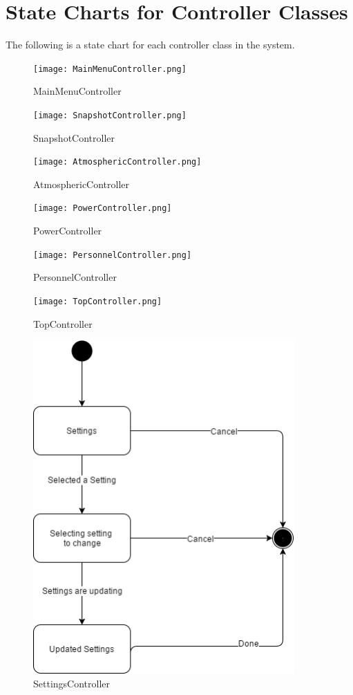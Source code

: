 \documentclass[]{article}
\begin{document}
\section{State Charts for Controller Classes}
\label{sec:state_charts_for_controller_classes}

The following is a state chart for each controller class in the system.

\begin{figure}[H]
	\centering
	\texttt{[image: MainMenuController.png]}
	\caption{MainMenuController}
\end{figure}
\begin{figure}[H]
	\centering
	\texttt{[image: SnapshotController.png]}
	\caption{SnapshotController}
\end{figure}
\begin{figure}[H]
	\centering
	\texttt{[image: AtmosphericController.png]}
	\caption{AtmosphericController}
\end{figure}
\begin{figure}[H]
	\centering
	\texttt{[image: PowerController.png]}
	\caption{PowerController}
\end{figure}
\begin{figure}[H]
	\centering
	\texttt{[image: PersonnelController.png]}
	\caption{PersonnelController}
\end{figure}
\begin{figure}[H]
	\centering
	\texttt{[image: TopController.png]}
	\caption{TopController}
\end{figure}
\begin{figure}[H]
	\centering
	\includegraphics[width=100mm]{SettingsController.png}
	\caption{SettingsController}
\end{figure}
\end{document}
